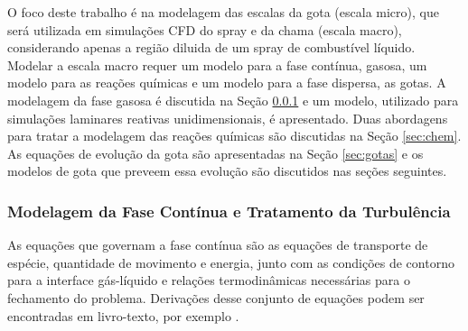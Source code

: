 O foco deste trabalho é na modelagem das escalas da gota (escala micro), que será utilizada em simulações CFD do spray e da chama (escala macro), considerando apenas a região diluida de um spray de combustível líquido.
Modelar a escala macro requer um modelo para a fase contínua, gasosa, um modelo para as reações químicas e um modelo para a fase dispersa, as gotas.
A modelagem da fase gasosa é discutida na Seção \ref{sec:gas} e um modelo, utilizado para simulações laminares reativas unidimensionais, é apresentado.
Duas abordagens para tratar a modelagem das reações químicas são discutidas na Seção \ref{sec:chem}.
As equações de evolução da gota são apresentadas na Seção \ref{sec:gotas} e os modelos de gota que preveem essa evolução são discutidos nas seções seguintes.





\subsubsection{Modelagem da Fase Contínua e Tratamento da Turbulência} \label{sec:gas}

As equações que governam a fase contínua são as equações de transporte de espécie, quantidade de movimento e energia, junto com as condições de contorno para a interface gás-líquido e relações termodinâmicas necessárias para o fechamento do problema.
Derivações desse conjunto de equações podem ser encontradas em livro-texto, por exemplo \cite{Williams1985,Kuo2005,Law2006,Glassman2008}.

